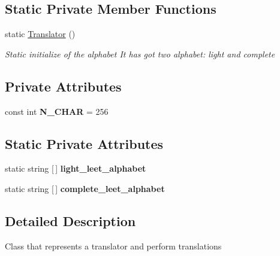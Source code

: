 \subsection*{Static Private Member Functions}
\begin{DoxyCompactItemize}
\item 
static \mbox{\hyperlink{class_leet_translator_grafica_1_1_translator_a196b667bf978f78c18068a0cde72cd67}{Translator}} ()
\begin{DoxyCompactList}\small\item\em Static initialize of the alphabet It has got two alphabet\+: light and complete \end{DoxyCompactList}\end{DoxyCompactItemize}
\subsection*{Private Attributes}
\begin{DoxyCompactItemize}
\item 
\mbox{\label{class_leet_translator_grafica_1_1_translator_ad2fd30cbcd0e38c521c1c030611b4326}} 
const int {\bfseries N\+\_\+\+C\+H\+AR} = 256
\end{DoxyCompactItemize}
\subsection*{Static Private Attributes}
\begin{DoxyCompactItemize}
\item 
\mbox{\label{class_leet_translator_grafica_1_1_translator_aa42f319a27433723c126ceb7d2db1e7b}} 
static string \mbox{[}$\,$\mbox{]} {\bfseries light\+\_\+leet\+\_\+alphabet}
\item 
\mbox{\label{class_leet_translator_grafica_1_1_translator_afd1909e5598e89e3a68c7c7d918a5452}} 
static string \mbox{[}$\,$\mbox{]} {\bfseries complete\+\_\+leet\+\_\+alphabet}
\end{DoxyCompactItemize}


\subsection{Detailed Description}
Class that represents a translator and perform translations 



